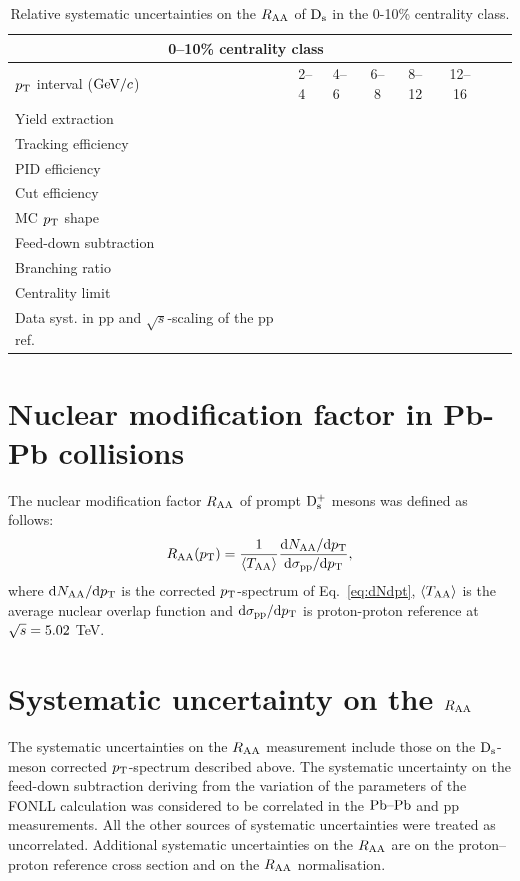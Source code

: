 \begin{table}[!h]
\centering
\begin{tabular}{|l|l|l|c|c|c|c|c|}
\hline
\multicolumn{6}{|c|}{0--10\% centrality class}       \\                                                                                                                                                                                                                                               \hline
$p_{\rm T}$ interval ($\mathrm{GeV}/c$)           & 2--4        &    4--6          & 6--8      &   8--12            & 12--16                  \\ 
Yield extraction & & & & & \\
Tracking efficiency & & & & & \\
PID efficiency & & & & & \\
Cut efficiency & & & & & \\
MC $p_{\rm T}$ shape & & & & & \\
Feed-down subtraction & & & & & \\
Branching ratio & & & & & \\
Centrality limit & & & & & \\
Data syst. in pp and $\sqrt s$-scaling of the pp ref. & & & & & \\
\hline
\end{tabular}
\caption{Relative systematic uncertainties on the $R_{\rm AA}$ of ${\rm D_s}$ in the 0-10\% centrality class.}
\label{tab:sysunc_yieldtable}
\end{table}

\section{Nuclear modification factor in Pb-Pb collisions}
\label{sec:RAA}
The nuclear modification factor $R_{\rm AA}$ of prompt ${\rm D_s^+}$ mesons was defined as follows:
\begin{equation}
\label{eq:RAADs}
R_{\rm AA} (p_{\rm T}) = \frac{1}{\langle T_{\rm AA} \rangle} \frac{{\rm d} N_{\rm AA}/{\rm d}p_{\rm T}}{{\rm d} \sigma_{\rm pp}/{\rm d} p_{\rm T}},
\end{equation}
where ${\rm d} N_{\rm AA}/{\rm d}p_{\rm T}$ is the corrected $p_{\rm T}$-spectrum of 
Eq.~\ref{eq:dNdpt}, $\langle T_{\rm AA} \rangle$ is the 
average nuclear overlap function and ${\rm d} \sigma_{\rm pp}/{\rm d} p_{\rm T}$ is 
proton-proton reference at $\sqrt{s} = 5.02$ TeV.
\section{Systematic uncertainty on the $R_{\rm AA}$}
\label{sec:SystRAA}
The systematic uncertainties on the $R_{\rm AA}$ measurement include those 
on the ${\rm D_s}$-meson corrected $p_{\rm T}$-spectrum described above. The systematic 
uncertainty on the feed-down subtraction deriving from
the variation of the parameters of the FONLL calculation was considered to be
correlated in the $\mbox{Pb--Pb}$ and pp measurements. All the 
other sources of systematic uncertainties were treated as uncorrelated. 
Additional systematic uncertainties on the $R_{\rm AA}$ are on 
the proton--proton reference cross section and on the $R_{\rm AA}$ normalisation. 

